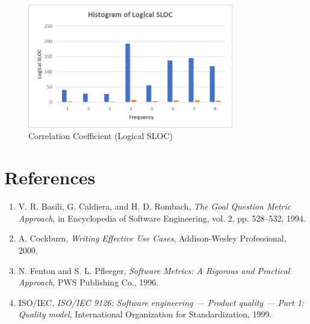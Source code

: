 \documentclass[english,12pt,a4paper]{report}
\begin{document}
	\begin{figure}[h]
		\centering
		\includegraphics[width=0.8\textwidth]{images/HIstoSLOC.png}
		\caption{Correlation Coefficient (Logical SLOC)}
		\label{fig:Correlation Coefficient (Logical SLOC)}
	\end{figure}
	
	\chapter{References}
	\begin{enumerate}
		\renewcommand{\labelenumi}{[\theenumi]}
		\item V. R. Basili, G. Caldiera, and H. D. Rombach, \textit{The Goal Question Metric Approach}, in Encyclopedia of Software Engineering, vol. 2, pp. 528--532, 1994.
		\item A. Cockburn, \textit{Writing Effective Use Cases}, Addison-Wesley Professional, 2000.
		\item N. Fenton and S. L. Pfleeger, \textit{Software Metrics: A Rigorous and Practical Approach}, PWS Publishing Co., 1996.
		\item ISO/IEC, \textit{ISO/IEC 9126: Software engineering — Product quality — Part 1: Quality model}, International Organization for Standardization, 1999.
	\end{enumerate}
	
\end{document}
